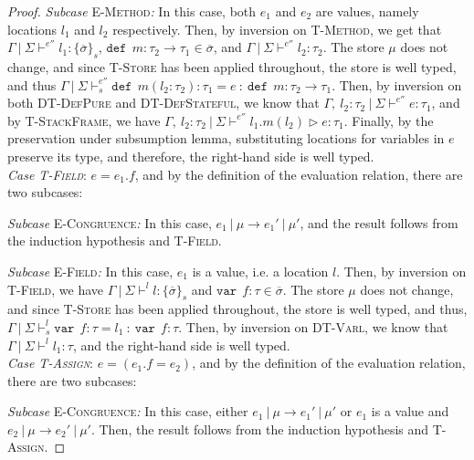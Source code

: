 \documentclass{llncs}
\newcommand{\keywadj}[1]{\mathtt{#1}}
\newcommand{\keyw}[1]{\keywadj{#1}~}
\begin{document}
\begin{proof}
\textit{Subcase} \textsc{E-Method}\textit{:} In this case, both $e_1$ and $e_2$ are values, namely locations $l_1$ and $l_2$ respectively. Then, by inversion on \textsc{T-Method}, we get that $\Gamma~|~\Sigma \vdash^{e''} l_1 : \{ \overline{\sigma} \}_s$, $\keyw{def}~ m : \tau_2 \rightarrow \tau_1 \in \overline{\sigma}$, and $\Gamma~|~\Sigma \vdash^{e''} l_2 : \tau_2$. The store $\mu$ does not change, and since \textsc{T-Store} has been applied throughout, the store is well typed, and thus \mbox{$\Gamma~|~\Sigma \vdash^{e''}_s \keyw{def}~ m(l_2 : \tau_2) : \tau_1 = e~:~\keyw{def}~ m : \tau_2 \rightarrow \tau_1$}. Then, by inversion on both \textsc{DT-DefPure} and \textsc{DT-DefStateful}, we know that $\Gamma,~l_2 : \tau_2~|~\Sigma \vdash^{e''} e : \tau_1$, and by \textsc{T-StackFrame}, we have $\Gamma,~l_2 : \tau_2~|~\Sigma \vdash^{e''} l_1.m(l_2) \rhd e : \tau_1$. Finally, by the preservation under subsumption lemma, substituting locations for variables in $e$ preserve its type, and therefore, the right-hand side is well typed.
\\

\noindent\textit{Case \textsc{T-Field}}:
$e = e_1.f$, and by the definition of the evaluation relation, there are two subcases:

\textit{Subcase} \textsc{E-Congruence}\textit{:} In this case, $e_1~|~\mu \longrightarrow e_1'~|~\mu'$, and the result follows from the induction hypothesis and \textsc{T-Field}.

\textit{Subcase} \textsc{E-Field}\textit{:} In this case, $e_1$ is a value, i.e. a location $l$. Then, by inversion on  \textsc{T-Field}, we have $\Gamma~|~\Sigma \vdash^l l : \{ \overline{\sigma} \}_s$ and $\keyw{var}~ f : \tau \in \overline{\sigma}$. The store $\mu$ does not change, and since \textsc{T-Store} has been applied throughout, the store is well typed, and thus, \mbox{$\Gamma~|~\Sigma \vdash^l_s \keyw{var}~ f : \tau = l_1~:~\keyw{var}~ f : \tau$}. Then, by inversion on \textsc{DT-Varl}, we know that $\Gamma~|~\Sigma \vdash^l l_1 : \tau$, and the right-hand side is well typed.
\\

\noindent\textit{Case \textsc{T-Assign}}:
$e = (e_1.f = e_2)$, and by the definition of the evaluation relation, there are two subcases:

\textit{Subcase} \textsc{E-Congruence}\textit{:} In this case, either $e_1~|~\mu \longrightarrow e_1'~|~\mu'$ or $e_1$ is a value and $e_2~|~\mu \longrightarrow e_2'~|~\mu'$. Then, the result follows from the induction hypothesis and \textsc{T-Assign}.


\end{proof}
\end{document}
